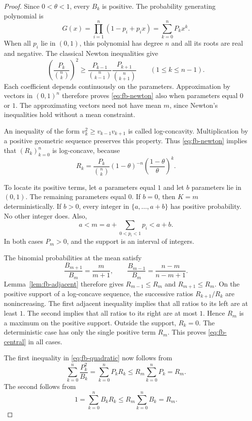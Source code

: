 \documentclass[11pt,a4paper]{article}
\theoremstyle{definition}
\theoremstyle{remark}
\begin{document}
\begin{proof}
Since $0<\theta<1$, every $B_k$ is positive. The probability
generating polynomial is
\[
 G(x)=\prod_{i=1}^n(1-p_i+p_ix)=\sum_{k=0}^nP_kx^k.
\]
When all $p_i$ lie in $(0,1)$, this polynomial has degree $n$ and
all its roots are real and negative. The classical Newton inequalities
give
\begin{equation}\label{eq:fb-newton}
 \left(\frac{P_k}{\binom nk}\right)^2
 \geq
 \frac{P_{k-1}}{\binom n{k-1}}
 \frac{P_{k+1}}{\binom n{k+1}}
 \qquad(1\leq k\leq n-1).
\end{equation}
Each coefficient depends continuously on the parameters.
Approximation by vectors in $(0,1)^n$ therefore proves
\eqref{eq:fb-newton} also when parameters equal $0$ or $1$.
The approximating vectors need not have mean $m$, since Newton's
inequalities hold without a mean constraint.

An inequality of the form $v_k^2\geq v_{k-1}v_{k+1}$ is called
log-concavity. Multiplication by a positive geometric sequence
preserves this property. Thus \eqref{eq:fb-newton} implies that
$(R_k)_{k=0}^n$ is log-concave, because
\[
 R_k=\frac{P_k}{\binom nk}
       (1-\theta)^{-n}
       \left(\frac{1-\theta}{\theta}\right)^k.
\]

To locate its positive terms, let $a$ parameters equal $1$ and let
$b$ parameters lie in $(0,1)$. The remaining parameters equal $0$.
If $b=0$, then $K=m$ deterministically. If $b>0$, every integer
in $\{a,\ldots,a+b\}$ has positive probability. No other integer
does. Also,
\[
 a<m=a+\sum_{0<p_i<1}p_i<a+b.
\]
In both cases $P_m>0$, and the support is an interval of integers.

The binomial probabilities at the mean satisfy
\[
 \frac{B_{m+1}}{B_m}=\frac{m}{m+1},
 \qquad
 \frac{B_{m-1}}{B_m}=\frac{n-m}{n-m+1}.
\]
Lemma~\ref{lem:fb-adjacent} therefore gives
$R_{m-1}\leq R_m$ and $R_{m+1}\leq R_m$.
On the positive support of a log-concave sequence, the successive
ratios $R_{k+1}/R_k$ are nonincreasing.
The first adjacent inequality implies that all ratios to its left
are at least $1$. The second implies that all ratios to its right
are at most $1$. Hence $R_m$ is a maximum on the positive support.
Outside the support, $R_k=0$. The deterministic case has only the
single positive term $R_m$. This proves \eqref{eq:fb-central} in
all cases.

The first inequality in \eqref{eq:fb-quadratic} now follows from
\[
 \sum_{k=0}^n\frac{P_k^2}{B_k}
 =\sum_{k=0}^nP_kR_k
 \leq R_m\sum_{k=0}^nP_k
 =R_m.
\]
The second follows from
\[
 1=\sum_{k=0}^nB_kR_k
 \leq R_m\sum_{k=0}^nB_k=R_m.
\]


\end{proof}
\end{document}

